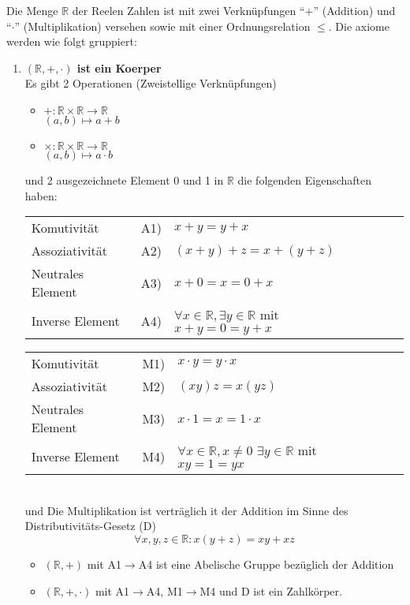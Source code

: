 Die Menge $\mathbb{R}$ der Reelen Zahlen ist mit zwei Verknüpfungen ``$+$'' (Addition) und ``$\cdot$'' (Multiplikation) versehen sowie mit einer Ordnungsrelation $\leq$. Die axiome werden wie folgt gruppiert:
\begin{enumerate}
\item \textbf{$\left( \mathbb{R},+,\cdot\right)$ ist ein Koerper}\\
Es gibt 2 Operationen (Zweistellige Verknüpfungen)
\begin{itemize}
\item $+:\mathbb{R}\times\mathbb{R}\to\mathbb{R}$\\
$(a,b)\mapsto a+b$
\item $\times:\mathbb{R}\times\mathbb{R}\to\mathbb{R}$\\
$(a,b)\mapsto a\cdot b$
\end{itemize}
und 2 ausgezeichnete Element 0 und 1 in $\mathbb{R}$ die folgenden Eigenschaften haben:\\

\begin{tabular}{l r l r l}
Komutivität & A1) & $x+y=y+x$  \\ 
Assoziativität & A2) & $(x+y)+z=x+(y+z)$  \\
Neutrales Element & A3) & $x+0=x=0+x$ \\
Inverse Element & A4) & $\forall x\in\mathbb{R}, \exists y\in\mathbb{R}$ mit $x+y=0=y+x$
\end{tabular}

\begin{tabular}{l r l r l}
Komutivität  & M1) & $x\cdot y=y\cdot x$ \\ 
Assoziativität  & M2) & $(xy)z=x(yz)$ \\
Neutrales Element  & M3) & $x\cdot 1= x =1\cdot x$\\
Inverse Element  & M4) & $\forall x\in\mathbb{R}, x\not =0$  $ \exists y\in\mathbb{R}$ mit $xy=1=yx$
\end{tabular}
\\

und Die Multiplikation ist verträglich it der Addition im Sinne des Distributivitäts-Gesetz (D)\[\forall x,y,z\in\mathbb{R}:x(y+z)=xy+xz\]

\begin{itemize}
\item $( \mathbb{R},+)$ mit A1$\to$A4 ist eine Abelische Gruppe bezüglich der Addition
\item  $( \mathbb{R},+,\cdot)$ mit A1$\to$A4, M1$\to$M4 und D ist ein Zahlkörper. 
\end{itemize}


\end{enumerate}
